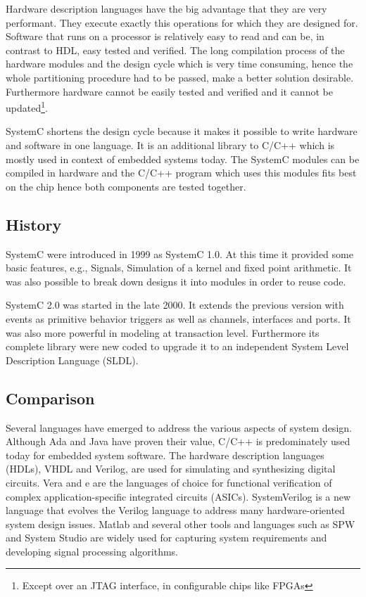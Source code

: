 \documentclass{article}
\begin{document}
	Hardware description languages have the big advantage that they are very performant.
	They execute exactly this operations for which they are designed for.	
	Software that runs on a processor is relatively easy to read and can be, in contrast to HDL, easy  tested and verified.	
	The long compilation process of the hardware modules and the design cycle which is very time consuming, hence the whole partitioning procedure had to be passed, make a better solution desirable.
	Furthermore hardware cannot be easily tested and verified and it cannot be updated\footnote{Except over an JTAG interface, in configurable chips like FPGAs}.
	
	SystemC shortens the design cycle because it makes it possible to write hardware and software in one language.
	It is an additional library to C/C++ which is mostly used in context of embedded systems today.
	The SystemC modules can be compiled in hardware and the C/C++ program which uses this modules fits best on the chip hence both components are tested together.
	  \subsection{History}
	    SystemC were introduced in 1999 as SystemC 1.0. At this time it provided some basic features, e.g., Signals, Simulation of a kernel and fixed point arithmetic.
	    It was also possible to break down designs it into modules in order to reuse code.
	    
	    SystemC 2.0 was started in the late 2000. It extends the previous version with events as primitive behavior triggers as well as channels, interfaces and ports.
	    It was also more powerful in modeling at transaction level.
	    Furthermore its complete library were new coded to upgrade it to an independent System Level Description Language (SLDL).
		\subsection{Comparison}
		Several languages have emerged to address the various aspects of system design. Although Ada and Java have proven their value, C/C++ is predominately used today for embedded system software. The hardware description languages (HDLs), VHDL and Verilog, are used for simulating and synthesizing digital circuits. Vera and e are the languages of choice for functional verification of complex application-specific integrated circuits (ASICs). SystemVerilog is a new language that evolves the Verilog language to address many hardware-oriented system design issues. Matlab and several other tools and languages such as SPW and System Studio are widely used for capturing system requirements and developing signal processing algorithms.
\end{document}
